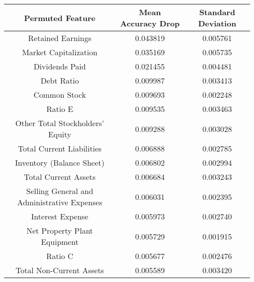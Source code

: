 \tiny
\begin{tabular}{ccc}
\toprule
Permuted Feature & Mean Accuracy Drop & Standard Deviation \\
\midrule
Retained Earnings & 0.043819 & 0.005761 \\
Market Capitalization & 0.035169 & 0.005735 \\
Dividends Paid & 0.021455 & 0.004481 \\
Debt Ratio & 0.009987 & 0.003413 \\
Common Stock & 0.009693 & 0.002248 \\
Ratio E & 0.009535 & 0.003463 \\
Other Total Stockholders' Equity & 0.009288 & 0.003028 \\
Total Current Liabilities & 0.006888 & 0.002785 \\
Inventory (Balance Sheet) & 0.006802 & 0.002994 \\
Total Current Assets & 0.006684 & 0.003243 \\
Selling General and Administrative Expenses & 0.006031 & 0.002395 \\
Interest Expense & 0.005973 & 0.002740 \\
Net Property Plant Equipment & 0.005729 & 0.001915 \\
Ratio C & 0.005677 & 0.002476 \\
Total Non-Current Assets & 0.005589 & 0.003420 \\
\bottomrule
\end{tabular}

\normalsize